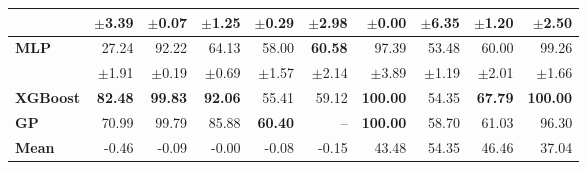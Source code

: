 \begin{table}[!htbp]
\begin{tabular}{lrrrrr||rrrr}
 & $\pm$3.39 & $\pm$0.07 & $\pm$1.25 & $\pm$0.29 & $\pm$2.98 & $\pm$0.00 & $\pm$6.35 & $\pm$1.20 & $\pm$2.50 \\
\midrule
\textbf{MLP} & 27.24 & 92.22 & 64.13 & 58.00 & \textbf{60.58} & 97.39 & 53.48 & 60.00 & 99.26 \\
 & $\pm$1.91 & $\pm$0.19 & $\pm$0.69 & $\pm$1.57 & $\pm$2.14 & $\pm$3.89 & $\pm$1.19 & $\pm$2.01 & $\pm$1.66 \\
\midrule
\textbf{XGBoost} & \textbf{82.48} & \textbf{99.83} & \textbf{92.06} & 55.41 & 59.12 & \textbf{100.00} & 54.35 & \textbf{67.79} & \textbf{100.00} \\
\midrule
\textbf{GP} & 70.99 & 99.79 & 85.88 & \textbf{60.40} & -- & \textbf{100.00} & 58.70 & 61.03 & 96.30 \\
\midrule
\textbf{Mean} & -0.46 & -0.09 & -0.00 & -0.08 & -0.15 & 43.48 & 54.35 & 46.46 & 37.04 \\
\bottomrule
\end{tabular}
\end{table}